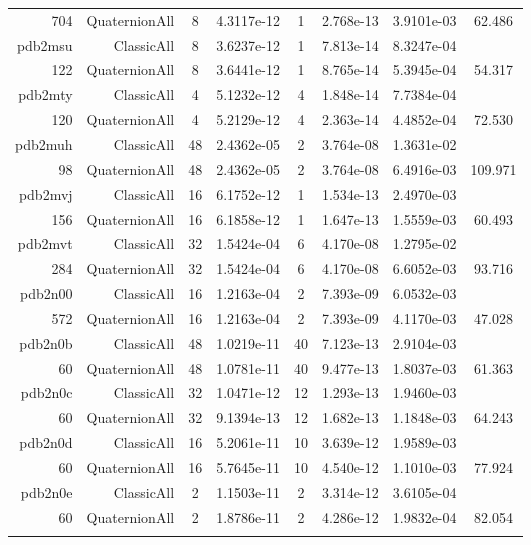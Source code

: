 \begin{xltabular}{\textwidth}{r|rcS[table-format=1.4e+2]cS[table-format=1.3e+2]S[table-format=1.4e+2]S[table-format=-1.3]}
704 & QuaternionAll & 8 & 4.3117e-12 & 1 & 2.768e-13 & 3.9101e-03 & 62.486\\  \addlinespace
pdb2msu & ClassicAll & 8 & 3.6237e-12 & 1 & 7.813e-14 & 8.3247e-04 & \\
122 & QuaternionAll & 8 & 3.6441e-12 & 1 & 8.765e-14 & 5.3945e-04 & 54.317\\  \addlinespace
pdb2mty & ClassicAll & 4 & 5.1232e-12 & 4 & 1.848e-14 & 7.7384e-04 & \\
120 & QuaternionAll & 4 & 5.2129e-12 & 4 & 2.363e-14 & 4.4852e-04 & 72.530\\  \addlinespace
pdb2muh & ClassicAll & 48 & 2.4362e-05 & 2 & 3.764e-08 & 1.3631e-02 & \\
98 & QuaternionAll & 48 & 2.4362e-05 & 2 & 3.764e-08 & 6.4916e-03 & 109.971\\  \addlinespace
pdb2mvj & ClassicAll & 16 & 6.1752e-12 & 1 & 1.534e-13 & 2.4970e-03 & \\
156 & QuaternionAll & 16 & 6.1858e-12 & 1 & 1.647e-13 & 1.5559e-03 & 60.493\\  \addlinespace
pdb2mvt & ClassicAll & 32 & 1.5424e-04 & 6 & 4.170e-08 & 1.2795e-02 & \\
284 & QuaternionAll & 32 & 1.5424e-04 & 6 & 4.170e-08 & 6.6052e-03 & 93.716\\  \addlinespace
pdb2n00 & ClassicAll & 16 & 1.2163e-04 & 2 & 7.393e-09 & 6.0532e-03 & \\
572 & QuaternionAll & 16 & 1.2163e-04 & 2 & 7.393e-09 & 4.1170e-03 & 47.028\\  \addlinespace
pdb2n0b & ClassicAll & 48 & 1.0219e-11 & 40 & 7.123e-13 & 2.9104e-03 & \\
60 & QuaternionAll & 48 & 1.0781e-11 & 40 & 9.477e-13 & 1.8037e-03 & 61.363\\  \addlinespace
pdb2n0c & ClassicAll & 32 & 1.0471e-12 & 12 & 1.293e-13 & 1.9460e-03 & \\
60 & QuaternionAll & 32 & 9.1394e-13 & 12 & 1.682e-13 & 1.1848e-03 & 64.243\\  \addlinespace
pdb2n0d & ClassicAll & 16 & 5.2061e-11 & 10 & 3.639e-12 & 1.9589e-03 & \\
60 & QuaternionAll & 16 & 5.7645e-11 & 10 & 4.540e-12 & 1.1010e-03 & 77.924\\  \addlinespace
pdb2n0e & ClassicAll & 2 & 1.1503e-11 & 2 & 3.314e-12 & 3.6105e-04 & \\
60 & QuaternionAll & 2 & 1.8786e-11 & 2 & 4.286e-12 & 1.9832e-04 & 82.054\\  \addlinespace

\end{xltabular}
